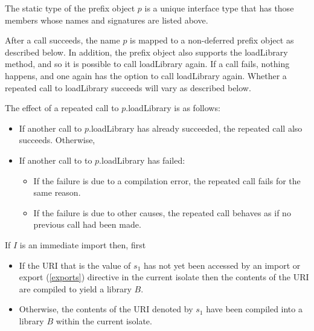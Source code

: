 \documentclass{article}
\newcommand{\code}[1]{{\sf #1}}
\begin{document}
The static type of the prefix object $p$ is a unique interface type that has those members whose names and signatures are listed above.

\LMHash{}
After a call succeeds, the name $p$ is mapped to a non-deferred prefix object as described below. In addition, the prefix object also supports the \code{loadLibrary} method, and so it is possible to call \code{loadLibrary} again. If a call fails, nothing happens, and one again has the option to call \code{loadLibrary} again. Whether a repeated call to \code{loadLibrary} succeeds will vary as described below.

\LMHash{}
The effect of a repeated call to \code{$p$.loadLibrary} is as follows:
\begin{itemize}
\item
If another call to \code{$p$.loadLibrary} has already succeeded, the repeated call also succeeds. 
Otherwise,
\item
If another call to  to \code{$p$.loadLibrary} has failed:
\begin{itemize}
\item
If the failure is due to a compilation error, the repeated call fails for the same reason.
\item
If the failure is due to other causes, the repeated call behaves as if no previous call had been made.
\end{itemize}
\end{itemize}


\LMHash{}
If $I$ is an immediate import then, first

 \begin{itemize}
 \item
If  the URI that is the value of $s_1$ has not yet been accessed by an import or export (\ref{exports}) directive  in the current isolate then the contents of the URI  are compiled to yield a library $B$. 
\item Otherwise, the contents of the URI denoted by $s_1$ have been compiled into a library $B$ within the current isolate.
\end{itemize}
\end{document}
